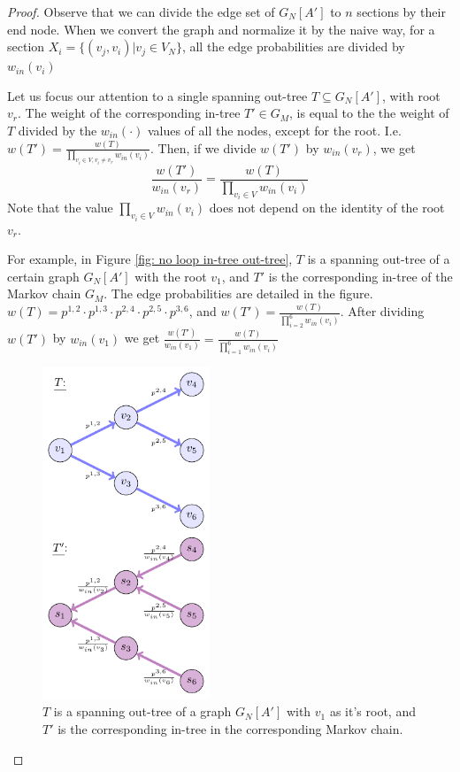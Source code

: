 \documentclass[sigconf,anonymous]{aamas}
\begin{document}
\begin{proof}
Observe that we can divide the edge set of $G_N[A']$ to $n$ sections by their end node.
When we convert the graph and normalize it by the naive way, for a section $X_i = \{(v_j,v_i)|v_j\in V_N\}$, all the edge probabilities are divided by $w_{in}(v_i)$

Let us focus our attention to %
a single spanning out-tree $T\subseteq G_N[A']$, with root $v_r$. The weight of the corresponding in-tree $T'\in G_M$, is equal to the the weight of $T$ divided by the $w_{in}(\cdot)$ values of all the nodes, except for the root. I.e. $w(T') = \frac{w(T)}{ \prod_{v_i\in V, v_i\neq v_r} w_{in}(v_i)}$. Then, if we divide $w(T')$ by $w_{in}(v_r)$, we get 
\begin{equation}
    \frac{w(T')}{w_{in}(v_r)} = \frac{w(T)}{ \prod_{v_i\in V} w_{in}(v_i)}
\end{equation}
Note that the value $\prod_{v_i\in V} w_{in}(v_i)$ does not depend on the identity of the root $v_r$.


For example, in Figure \ref{fig: no loop in-tree out-tree}, $T$ is a spanning out-tree of a certain graph $G_N[A']$ with the root $v_1$, and $T'$ is the corresponding in-tree of the Markov chain $G_M$. The edge probabilities are detailed in the figure. $w(T) = p^{1,2} \cdot p^{1,3}\cdot p^{2,4} \cdot p^{2,5}\cdot p^{3,6}$,
and
$w(T') = \frac{w(T)}
{\prod_{i=2}^6 w_{in}(v_i)}$.
 After dividing $w(T')$ by $w_{in}(v_1)$ we get 
$
     \frac{w(T')}{w_{in}(v_1)}= \frac{w(T)}{\prod_{i=1}^6w_{in}(v_i)}
$
 
 
\begin{figure}[hbpt] 
    \centering
    \includegraphics[width= 5cm]{no_loop_out_tree_vs__in_tree (1).pdf}
  \caption{$T$ is a spanning out-tree  of a graph $G_N[A']$ with $v_1$ as it's root, and $T'$ is the corresponding in-tree in the corresponding Markov chain.
  }


\end{figure}
\end{proof}
\end{document}
